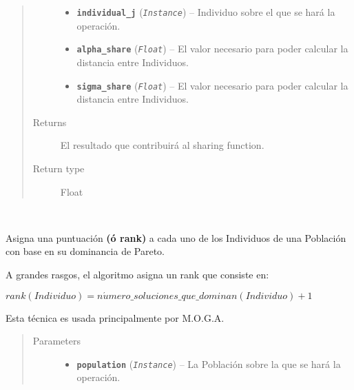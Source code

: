 \documentclass[letterpaper,10pt,english]{sphinxmanual}
\begin{document}
\begin{fulllineitems}
\begin{fulllineitems}
\begin{quote}
\begin{description}
\begin{itemize}
\item {} 
\textbf{\texttt{individual\_j}} (\emph{\texttt{Instance}}) -- Individuo sobre el que se hará la operación.

\item {} 
\textbf{\texttt{alpha\_share}} (\emph{\texttt{Float}}) -- El valor necesario para poder calcular la distancia entre Individuos.

\item {} 
\textbf{\texttt{sigma\_share}} (\emph{\texttt{Float}}) -- El valor necesario para poder calcular la distancia entre Individuos.

\end{itemize}

\item[{Returns}] \leavevmode
El resultado que contribuirá al sharing function.

\item[{Return type}] \leavevmode
Float

\end{description}\end{quote}

\end{fulllineitems}


\begin{fulllineitems}
\label{Model/Community/Community:Model.Community.Community.Community.assign_fonseca_and_flemming_pareto_rank}~
\begin{DUlineblock}{0em}
\item[] Asigna una puntuación \textbf{(ó rank)} a cada uno de los Individuos de una Población 
con base en su dominancia de Pareto.
\item[] A grandes rasgos, el algoritmo asigna un rank que consiste en:
\end{DUlineblock}

\begin{center}\(rank(Individuo) = n\acute{u}mero\_soluciones\_que\_dominan(Individuo) + 1\)
\end{center}
\begin{DUlineblock}{0em}
\item[] Esta técnica es usada principalmente por M.O.G.A.
\end{DUlineblock}
\begin{quote}\begin{description}
\item[{Parameters}] \leavevmode\begin{itemize}
\item {} 
\textbf{\texttt{population}} (\emph{\texttt{Instance}}) -- La Población sobre la que se hará la operación.


\end{itemize}
\end{description}
\end{quote}
\end{fulllineitems}
\end{fulllineitems}
\end{document}
